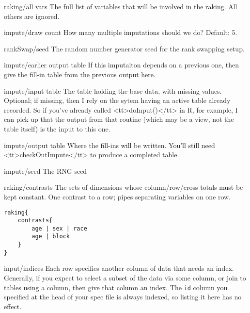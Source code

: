\begin{key}{    raking/all vars}
     The full list of variables that will be involved in the
       raking. All others are ignored. 
\end{key}

\begin{key}{  impute/draw count}
   How many multiple imputations should we do? Default: 5.
\end{key}

\begin{key}{rankSwap/seed}
 The random number generator seed for the rank swapping setup.
\end{key}

\begin{key}{  impute/earlier output table}
   If this imputaiton depends on a previous one, then give the fill-in table from the previous output here.
 
\end{key}

\begin{key}{impute/input table}
 The table holding the base data, with missing values. 
  Optional; if missing, then I rely on the sytem having an active table already recorded. So if you've already called <tt>doInput()</tt> in R, for example, I can pick up that the output from that routine (which may be a view, not the table itself) is the input to this one. 
\end{key}

\begin{key}{  impute/output table}
   Where the fill-ins will be written. You'll still need <tt>checkOutImpute</tt> to produce a completed table.
\end{key}

\begin{key}{  impute/seed}
   The RNG seed
\end{key}

\begin{key}{raking/contrasts}
 The sets of dimensions whose column/row/cross totals must be kept constant. One contrast to a row; pipes separating variables on one row.
\begin{lstlisting}
raking{
    contrasts{
        age | sex | race
        age | block
    }
}
\end{lstlisting} 
\end{key}

\begin{key}{input/indices}
 Each row specifies another column of data that needs an index. Generally, if you expect to select a subset of the data via some column, or join to tables using a column, then give that column an index. The {\tt id} column you specified at the head of your spec file is always indexed, so listing it here has no effect.
\end{key}

